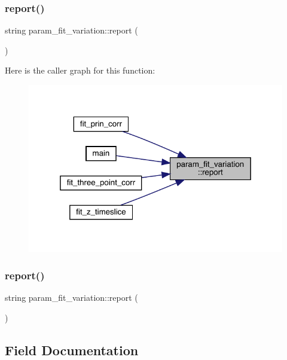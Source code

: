 \subsubsection{\texorpdfstring{report()}{report()}\hspace{0.1cm}{\footnotesize\ttfamily [1/2]}}
{\footnotesize\ttfamily string param\+\_\+fit\+\_\+variation\+::report (\begin{DoxyParamCaption}{ }\end{DoxyParamCaption})}

Here is the caller graph for this function\+:
\nopagebreak
\begin{figure}[H]
\begin{center}
\leavevmode
\includegraphics[width=319pt]{dc/d3e/structparam__fit__variation_ad23e3d149021d2847c33d2b77e4f7db1_icgraph}
\end{center}
\end{figure}
\mbox{\label{structparam__fit__variation_ad23e3d149021d2847c33d2b77e4f7db1}} 
\subsubsection{\texorpdfstring{report()}{report()}\hspace{0.1cm}{\footnotesize\ttfamily [2/2]}}
{\footnotesize\ttfamily string param\+\_\+fit\+\_\+variation\+::report (\begin{DoxyParamCaption}{ }\end{DoxyParamCaption})}



\subsection{Field Documentation}
\mbox{\label{structparam__fit__variation_a6478d4ad924a19408509b65a03e5ed18}} 
